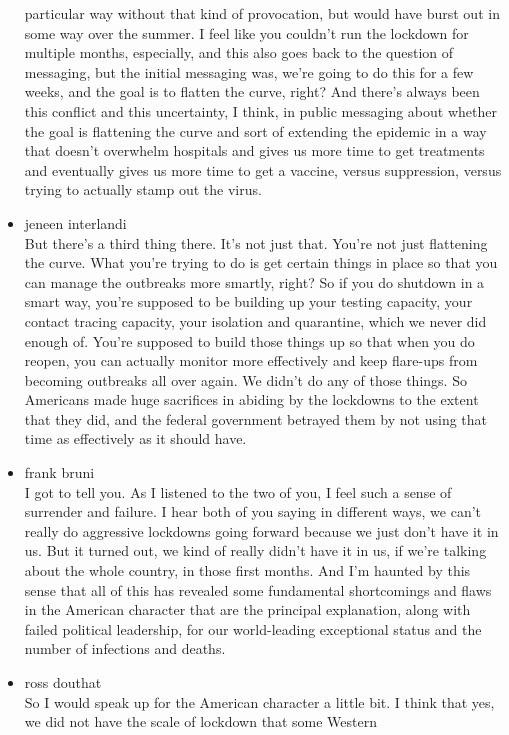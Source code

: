 \begin{itemize}
  particular way without that kind of provocation, but would have burst
  out in some way over the summer. I feel like you couldn't run the
  lockdown for multiple months, especially, and this also goes back to
  the question of messaging, but the initial messaging was, we're going
  to do this for a few weeks, and the goal is to flatten the curve,
  right? And there's always been this conflict and this uncertainty, I
  think, in public messaging about whether the goal is flattening the
  curve and sort of extending the epidemic in a way that doesn't
  overwhelm hospitals and gives us more time to get treatments and
  eventually gives us more time to get a vaccine, versus suppression,
  versus trying to actually stamp out the virus.
\item
  jeneen interlandi\\
  But there's a third thing there. It's not just that. You're not just
  flattening the curve. What you're trying to do is get certain things
  in place so that you can manage the outbreaks more smartly, right? So
  if you do shutdown in a smart way, you're supposed to be building up
  your testing capacity, your contact tracing capacity, your isolation
  and quarantine, which we never did enough of. You're supposed to build
  those things up so that when you do reopen, you can actually monitor
  more effectively and keep flare-ups from becoming outbreaks all over
  again. We didn't do any of those things. So Americans made huge
  sacrifices in abiding by the lockdowns to the extent that they did,
  and the federal government betrayed them by not using that time as
  effectively as it should have.
\item
  frank bruni\\
  I got to tell you. As I listened to the two of you, I feel such a
  sense of surrender and failure. I hear both of you saying in different
  ways, we can't really do aggressive lockdowns going forward because we
  just don't have it in us. But it turned out, we kind of really didn't
  have it in us, if we're talking about the whole country, in those
  first months. And I'm haunted by this sense that all of this has
  revealed some fundamental shortcomings and flaws in the American
  character that are the principal explanation, along with failed
  political leadership, for our world-leading exceptional status and the
  number of infections and deaths.
\item
  ross douthat\\
  So I would speak up for the American character a little bit. I think
  that yes, we did not have the scale of lockdown that some Western

\end{itemize}
